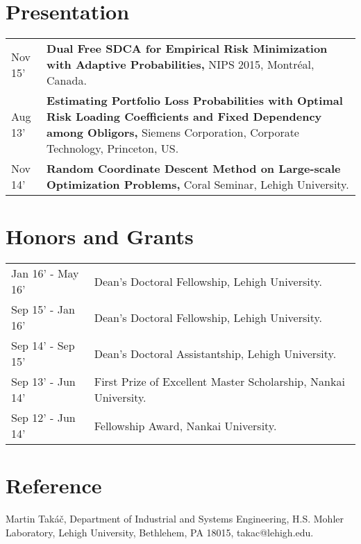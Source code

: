 \documentclass[letters,11pt]{article} %
\begin{document}
\section{Presentation}
\begin{longtable}{>{\centering}p{3.3cm}|p{14cm}}
    Nov 15' &\textbf{Dual Free SDCA for Empirical Risk Minimization with Adaptive Probabilities,} NIPS 2015, Montréal, Canada.  \\
    Aug 13' &\textbf{Estimating Portfolio Loss Probabilities with Optimal Risk Loading Coefficients and Fixed Dependency among Obligors,} Siemens Corporation, Corporate Technology, Princeton, US.\\
    Nov 14' &\textbf{Random Coordinate Descent Method on Large-scale Optimization Problems,} Coral Seminar, Lehigh University.
\end{longtable}

\section{Honors and Grants}
\begin{longtable}{>{\centering}p{3.3cm}|p{14cm}}
   Jan 16' - May 16' & Dean’s Doctoral Fellowship, Lehigh University.\\
   Sep 15' - Jan 16' & Dean’s Doctoral Fellowship, Lehigh University.\\
   Sep 14' - Sep 15' & Dean’s Doctoral Assistantship, Lehigh University.\\
   Sep 13' - Jun 14' & First Prize of Excellent Master Scholarship, Nankai University.\\
   Sep 12' - Jun 14' & Fellowship Award, Nankai University.\\
\end{longtable}


\section{Reference}
Martin Takáč, Department of Industrial and Systems Engineering, H.S. Mohler Laboratory, Lehigh University, Bethlehem, PA 18015, takac@lehigh.edu.
\end{document}
